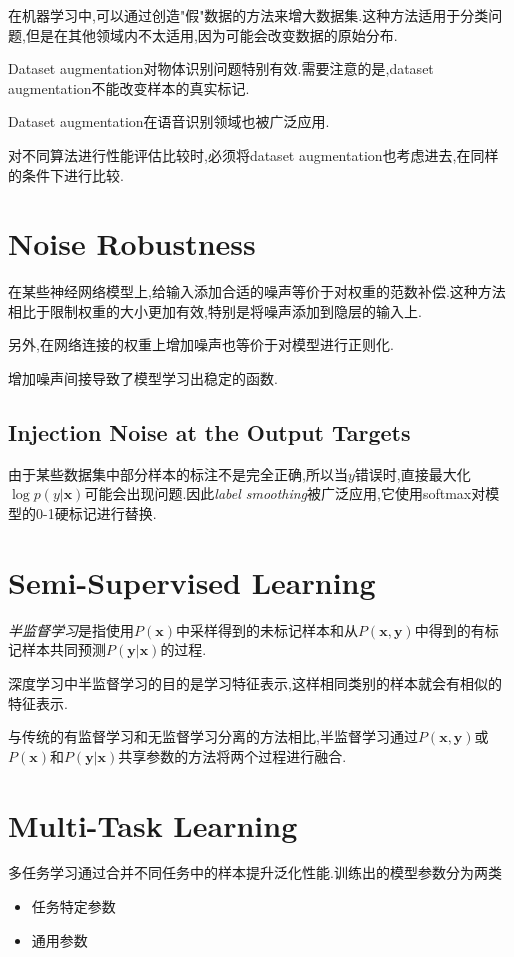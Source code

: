 在机器学习中,可以通过创造"假"数据的方法来增大数据集.这种方法适用于分类问题,但是在其他领域内不太适用,因为可能会改变数据的原始分布.

Dataset augmentation对物体识别问题特别有效.需要注意的是,dataset augmentation不能改变样本的真实标记.

Dataset augmentation在语音识别领域也被广泛应用.

对不同算法进行性能评估比较时,必须将dataset augmentation也考虑进去,在同样的条件下进行比较.

\section{Noise Robustness}

在某些神经网络模型上,给输入添加合适的噪声等价于对权重的范数补偿.这种方法相比于限制权重的大小更加有效,特别是将噪声添加到隐层的输入上.

另外,在网络连接的权重上增加噪声也等价于对模型进行正则化.

增加噪声间接导致了模型学习出稳定的函数.

\subsection{Injection Noise at the Output Targets}

由于某些数据集中部分样本的标注不是完全正确,所以当$y$错误时,直接最大化$\log p(y|\bm x)$可能会出现问题.因此\textit{label smoothing}被广泛应用,它使用softmax对模型的0-1硬标记进行替换.

\section{Semi-Supervised Learning}

\textit{半监督学习}是指使用$P(\bm x)$中采样得到的未标记样本和从$P(\bm{x, y})$中得到的有标记样本共同预测$P(\bm{y|x})$的过程.

深度学习中半监督学习的目的是学习特征表示,这样相同类别的样本就会有相似的特征表示.

与传统的有监督学习和无监督学习分离的方法相比,半监督学习通过$P(\bm{x,y})$或$P(\bm x)$和$P(\bm{y|x})$共享参数的方法将两个过程进行融合.

\section{Multi-Task Learning}

多任务学习通过合并不同任务中的样本提升泛化性能.训练出的模型参数分为两类
\begin{itemize}
    \item 任务特定参数
    \item 通用参数
\end{itemize}

